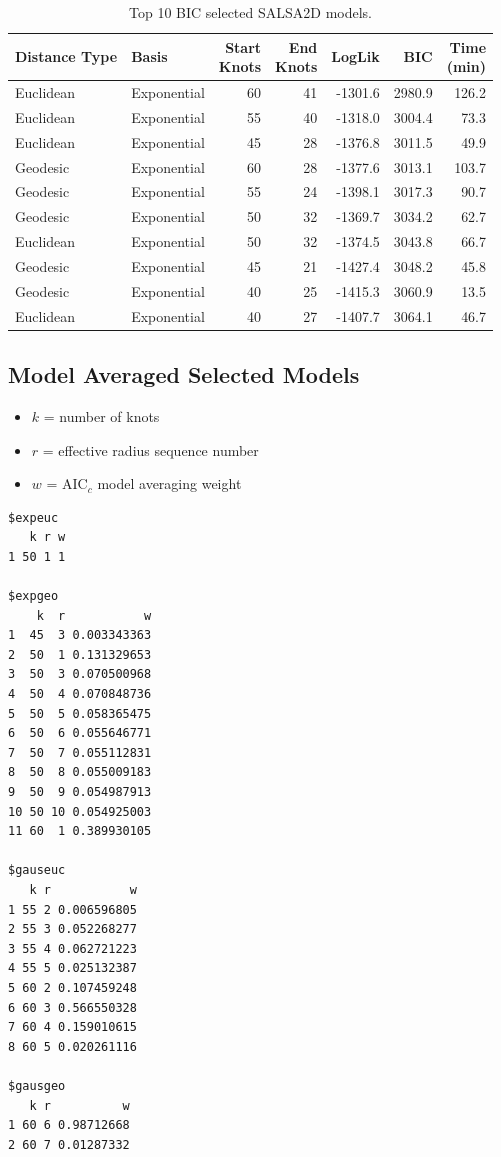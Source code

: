 \begin{table}[!htb]
    \centering
\begin{tabular}{|l|l|r|r|r|r|r|}
\hline
Distance Type & Basis & \makecell[r]{Start \\Knots} & \makecell[l]{End \\Knots} & LogLik & BIC & \makecell[l]{Time \\(min)}\\
\hline
Euclidean & Exponential & 60 & 41 & -1301.6 & 2980.9 & 126.2\\
\hline
Euclidean & Exponential & 55 & 40 & -1318.0 & 3004.4 & 73.3\\
\hline
Euclidean & Exponential & 45 & 28 & -1376.8 & 3011.5 & 49.9\\
\hline
Geodesic & Exponential & 60 & 28 & -1377.6 & 3013.1 & 103.7\\
\hline
Geodesic & Exponential & 55 & 24 & -1398.1 & 3017.3 & 90.7\\
\hline
Geodesic & Exponential & 50 & 32 & -1369.7 & 3034.2 & 62.7\\
\hline
Euclidean & Exponential & 50 & 32 & -1374.5 & 3043.8 & 66.7\\
\hline
Geodesic & Exponential & 45 & 21 & -1427.4 & 3048.2 & 45.8\\
\hline
Geodesic & Exponential & 40 & 25 & -1415.3 & 3060.9 & 13.5\\
\hline
Euclidean & Exponential & 40 & 27 & -1407.7 & 3064.1 & 46.7\\
\hline
\end{tabular}
\caption{Top 10 BIC selected SALSA2D models.}
    \label{tab:my_label}
\end{table}

\clearpage

\subsection{Model Averaged Selected Models}

\begin{itemize}
    \item $k$ = number of knots
    \item $r$ = effective radius sequence number
    \item $w$ = AIC$_c$ model averaging weight
\end{itemize}

\begin{verbatim}
$expeuc
   k r w
1 50 1 1

$expgeo
    k  r           w
1  45  3 0.003343363
2  50  1 0.131329653
3  50  3 0.070500968
4  50  4 0.070848736
5  50  5 0.058365475
6  50  6 0.055646771
7  50  7 0.055112831
8  50  8 0.055009183
9  50  9 0.054987913
10 50 10 0.054925003
11 60  1 0.389930105

$gauseuc
   k r           w
1 55 2 0.006596805
2 55 3 0.052268277
3 55 4 0.062721223
4 55 5 0.025132387
5 60 2 0.107459248
6 60 3 0.566550328
7 60 4 0.159010615
8 60 5 0.020261116

$gausgeo
   k r          w
1 60 6 0.98712668
2 60 7 0.01287332
\end{verbatim}

